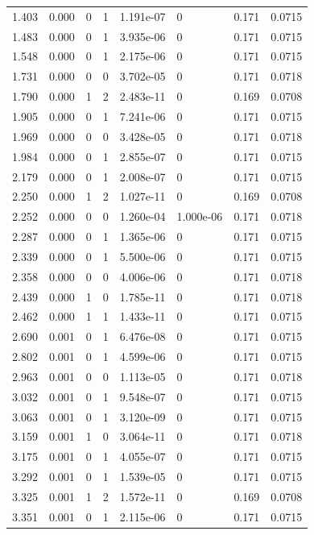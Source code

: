 \documentclass[preview]{standalone}
\begin{document}
{{\begin{tabular}{L{1.2cm}C{1.2cm} C{0.3cm}C{0.5cm} C{1.4cm}C{1.4cm} C{1.4cm}C{1.4cm}}
  1.403  &  0.000  & 0     &  1 &  1.191e-07  & 0  & 0.171 &  0.0715   \\ 
  1.483  &  0.000  & 0     &  1 &  3.935e-06  & 0  & 0.171 &  0.0715   \\ 
  1.548  &  0.000  & 0     &  1 &  2.175e-06  & 0  & 0.171 &  0.0715   \\ 
  1.731  &  0.000  & 0     &  0 &  3.702e-05  & 0  & 0.171 &  0.0718   \\ 
  1.790  &  0.000  & 1     &  2 &  2.483e-11  & 0  & 0.169 &  0.0708   \\ 
  1.905  &  0.000  & 0     &  1 &  7.241e-06  & 0  & 0.171 &  0.0715   \\ 
  1.969  &  0.000  & 0     &  0 &  3.428e-05  & 0  & 0.171 &  0.0718   \\ 
  1.984  &  0.000  & 0     &  1 &  2.855e-07  & 0  & 0.171 &  0.0715   \\ 
  2.179  &  0.000  & 0     &  1 &  2.008e-07  & 0  & 0.171 &  0.0715   \\ 
  2.250  &  0.000  & 1     &  2 &  1.027e-11  & 0  & 0.169 &  0.0708   \\ 
  2.252  &  0.000  & 0     &  0 &  1.260e-04  & 1.000e-06  & 0.171 &  0.0718   \\ 
  2.287  &  0.000  & 0     &  1 &  1.365e-06  & 0  & 0.171 &  0.0715   \\ 
  2.339  &  0.000  & 0     &  1 &  5.500e-06  & 0  & 0.171 &  0.0715   \\ 
  2.358  &  0.000  & 0     &  0 &  4.006e-06  & 0  & 0.171 &  0.0718   \\ 
  2.439  &  0.000  & 1     &  0 &  1.785e-11  & 0  & 0.171 &  0.0718   \\ 
  2.462  &  0.000  & 1     &  1 &  1.433e-11  & 0  & 0.171 &  0.0715   \\ 
  2.690  &  0.001  & 0     &  1 &  6.476e-08  & 0  & 0.171 &  0.0715   \\ 
  2.802  &  0.001  & 0     &  1 &  4.599e-06  & 0  & 0.171 &  0.0715   \\ 
  2.963  &  0.001  & 0     &  0 &  1.113e-05  & 0  & 0.171 &  0.0718   \\ 
  3.032  &  0.001  & 0     &  1 &  9.548e-07  & 0  & 0.171 &  0.0715   \\ 
  3.063  &  0.001  & 0     &  1 &  3.120e-09  & 0  & 0.171 &  0.0715   \\ 
  3.159  &  0.001  & 1     &  0 &  3.064e-11  & 0  & 0.171 &  0.0718   \\ 
  3.175  &  0.001  & 0     &  1 &  4.055e-07  & 0  & 0.171 &  0.0715   \\ 
  3.292  &  0.001  & 0     &  1 &  1.539e-05  & 0  & 0.171 &  0.0715   \\ 
  3.325  &  0.001  & 1     &  2 &  1.572e-11  & 0  & 0.169 &  0.0708   \\ 
  3.351  &  0.001  & 0     &  1 &  2.115e-06  & 0  & 0.171 &  0.0715   \\ 
\hline 
\end{tabular} 

}}
\end{document}
